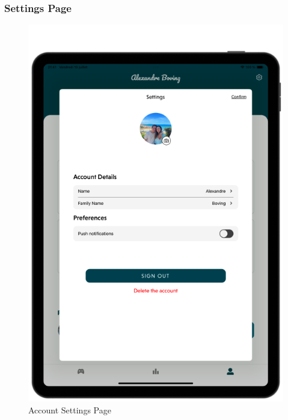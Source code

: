 \subsubsection{Settings Page}

\begin{figure}[H]
    \centering
    \begin{minipage}[b]{0.43\linewidth}
        \centering
        \includegraphics[width=\linewidth]{TabletUI/Account Settings Page.png}
        \caption{Account Settings Page}
    \end{minipage}
    \hspace{0.1\linewidth}
    \begin{minipage}[b]{0.43\linewidth}
        \centering

\end{minipage}
\end{figure}
